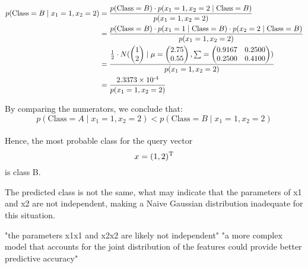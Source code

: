 \documentclass{article}
\begin{document}
\begin{align*}
    p(\text{Class} = B \mid x_1 = 1, x_2 = 2) 
    &= \frac{p(\text{Class} = B) \cdot p(x_1 = 1, x_2 = 2 \mid \text{Class} = B)}{p(x_1 = 1, x_2 = 2)} \\
    &= \frac{p(\text{Class} = B) \cdot p(x_1 = 1 \mid \text{Class} = B) \cdot p(x_2 = 2 \mid \text{Class} = B)}{p(x_1 = 1, x_2 = 2)} \\
    &= \frac{\frac{1}{2} \cdot N(
        \begin{pmatrix}1 \\ 2\end{pmatrix} \mid
        \mu = \begin{pmatrix}2.75 \\ 0.55\end{pmatrix},
        \sum = \begin{pmatrix}0.9167 & 0.2500 \\ 0.2500 & 0.4100 \end{pmatrix}
    )}{p(x_1 = 1, x_2 = 2)} \\
    &= \frac{2.3373\times10\textsuperscript{-4}}{p(x_1 = 1, x_2 = 2)}
\end{align*}

By comparing the numerators, we conclude that:
$$p(\text{Class} = A \mid x_1 = 1, x_2 = 2) < p(\text{Class} = B \mid x_1 = 1, x_2 = 2)$$
\\
Hence, the most probable class for the query vector $$x = (1, 2)\textsuperscript{T}$$ is class B.

The predicted class is not the same, what may indicate that the parameters of x1 and x2 are not independent, making a Naive Gaussian distribution inadequate for this situation.


"the parameters x1x1​ and x2x2​ are likely not independent"
"a more complex model that accounts for the joint distribution of the features could provide better predictive accuracy"
\newpage



\newpage
\end{document}
